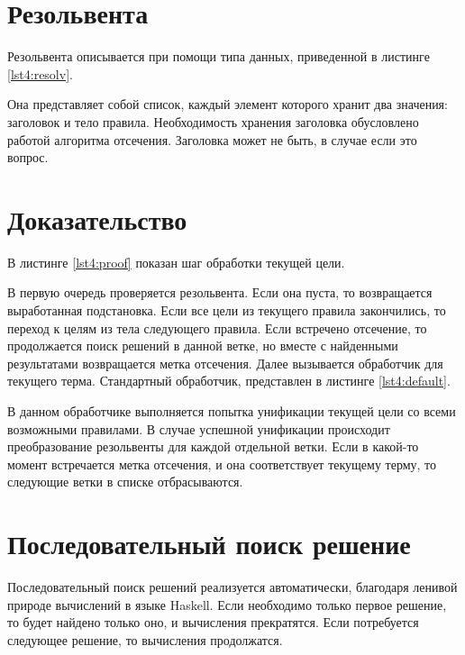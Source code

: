 \section{Резольвента}
Резольвента описывается при помощи типа данных, приведенной в листинге \ref{lst4:resolv}.


Она представляет собой список, каждый элемент которого хранит два значения: заголовок и тело правила. Необходимость хранения заголовка обусловлено работой алгоритма отсечения. Заголовка может не быть, в случае если это вопрос.

\section{Доказательство}
В листинге \ref{lst4:proof} показан шаг обработки текущей цели.


В первую очередь проверяется резольвента. Если она пуста, то возвращается выработанная подстановка. Если все цели из текущего правила закончились, то переход к целям из тела следующего правила.
Если встречено отсечение, то продолжается поиск решений в данной ветке, но вместе с найденными результатами возвращается метка отсечения.
Далее вызывается обработчик для текущего терма. Стандартный обработчик, представлен в листинге \ref{lst4:default}.


В данном обработчике выполняется попытка унификации текущей цели со всеми возможными правилами. В случае успешной унификации происходит преобразование резольвенты для каждой отдельной ветки. Если в какой-то момент встречается метка отсечения, и она соответствует текущему терму, то следующие ветки в списке отбрасываются.

\section{Последовательный поиск решение}
Последовательный поиск решений реализуется автоматически, благодаря ленивой природе вычислений в языке Haskell. Если необходимо только первое решение, то будет найдено только оно, и вычисления прекратятся. Если потребуется следующее решение, то вычисления продолжатся.

